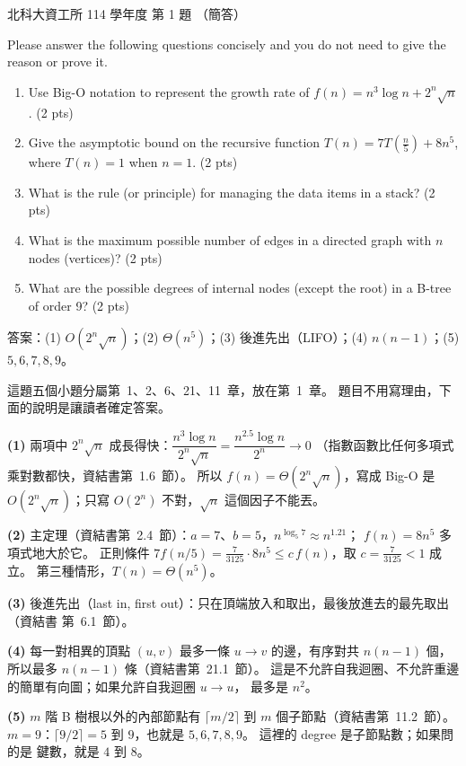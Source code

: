 \begin{pastexam}[label={px:ntut-114-ci-01}]{北科大資工所 114 學年度 第 1 題}
（簡答）

Please answer the following questions concisely and you do not need to give the reason or prove it.
\begin{enumerate}[label=(\arabic*)]
\item Use Big-O notation to represent the growth rate of $f(n)=n^3\log n+2^n\sqrt{n}$. (2 pts)
\item Give the asymptotic bound on the recursive function $T(n)=7T\left(\frac{n}{5}\right)+8n^5$, where $T(n)=1$ when $n=1$. (2 pts)
\item What is the rule (or principle) for managing the data items in a stack? (2 pts)
\item What is the maximum possible number of edges in a directed graph with $n$ nodes (vertices)? (2 pts)
\item What are the possible degrees of internal nodes (except the root) in a B-tree of order 9? (2 pts)
\end{enumerate}
\end{pastexam}

\begin{pastsoln}
答案：(1) $O(2^n\sqrt n)$；(2) $\Theta(n^5)$；(3) 後進先出（LIFO）；(4) $n(n-1)$；(5) $5, 6, 7, 8, 9$。

這題五個小題分屬第~1、2、6、21、11~章，放在第~1~章。 題目不用寫理由，下面的說明是讓讀者確定答案。

\textbf{(1)} 兩項中 $2^n\sqrt n$ 成長得快：$\dfrac{n^3 \log n}{2^n \sqrt n} = \dfrac{n^{2.5}\log n}{2^n} \to 0$
（指數函數比任何多項式乘對數都快，資結書第~1.6~節）。 所以 $f(n) = \Theta(2^n\sqrt n)$，寫成 Big-O
是 $O(2^n\sqrt n)$；只寫 $O(2^n)$ 不對，$\sqrt n$ 這個因子不能丟。

\textbf{(2)} 主定理（資結書第~2.4~節）：$a = 7$、$b = 5$，$n^{\log_5 7} \approx n^{1.21}$；
$f(n) = 8n^5$ 多項式地大於它。 正則條件 $7f(n/5) = \frac{7}{3125} \cdot 8n^5 \le c\, f(n)$，取
$c = \frac{7}{3125} < 1$ 成立。 第三種情形，$T(n) = \Theta(n^5)$。

\textbf{(3)} 後進先出（last in, first out）：只在頂端放入和取出，最後放進去的最先取出（資結書
第~6.1~節）。

\textbf{(4)} 每一對相異的頂點 $(u, v)$ 最多一條 $u \to v$ 的邊，有序對共 $n(n-1)$ 個，所以最多 $n(n-1)$
條（資結書第~21.1~節）。 這是不允許自我迴圈、不允許重邊的簡單有向圖；如果允許自我迴圈 $u \to u$，
最多是 $n^2$。

\textbf{(5)} $m$ 階 B 樹根以外的內部節點有 $\lceil m/2 \rceil$ 到 $m$ 個子節點（資結書第~11.2~節）。
$m = 9$：$\lceil 9/2 \rceil = 5$ 到 $9$，也就是 $5, 6, 7, 8, 9$。 這裡的 degree 是子節點數；如果問的是
鍵數，就是 $4$ 到 $8$。
\end{pastsoln}
